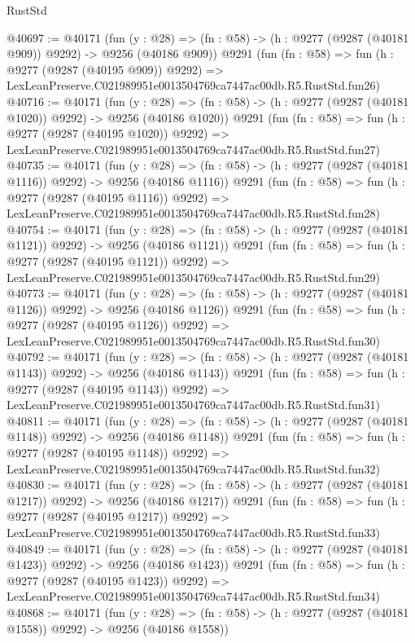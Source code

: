 \begin{lexlean}{RustStd}
\begin{coremodule}
@40697 := @40171
    (fun (y : @28) => (fn : @58) -> (h : @9277 (@9287 (@40181 @909)) @9292) -> @9256 (@40186 @909))
    @9291
    (fun (fn : @58) =>
    fun (h : @9277 (@9287 (@40195 @909)) @9292) =>
    LexLeanPreserve.C021989951e0013504769ca7447ac00db.R5.RustStd.fun26)
@40716 := @40171
    (fun (y : @28) =>
    (fn : @58) -> (h : @9277 (@9287 (@40181 @1020)) @9292) -> @9256 (@40186 @1020))
    @9291
    (fun (fn : @58) =>
    fun (h : @9277 (@9287 (@40195 @1020)) @9292) =>
    LexLeanPreserve.C021989951e0013504769ca7447ac00db.R5.RustStd.fun27)
@40735 := @40171
    (fun (y : @28) =>
    (fn : @58) -> (h : @9277 (@9287 (@40181 @1116)) @9292) -> @9256 (@40186 @1116))
    @9291
    (fun (fn : @58) =>
    fun (h : @9277 (@9287 (@40195 @1116)) @9292) =>
    LexLeanPreserve.C021989951e0013504769ca7447ac00db.R5.RustStd.fun28)
@40754 := @40171
    (fun (y : @28) =>
    (fn : @58) -> (h : @9277 (@9287 (@40181 @1121)) @9292) -> @9256 (@40186 @1121))
    @9291
    (fun (fn : @58) =>
    fun (h : @9277 (@9287 (@40195 @1121)) @9292) =>
    LexLeanPreserve.C021989951e0013504769ca7447ac00db.R5.RustStd.fun29)
@40773 := @40171
    (fun (y : @28) =>
    (fn : @58) -> (h : @9277 (@9287 (@40181 @1126)) @9292) -> @9256 (@40186 @1126))
    @9291
    (fun (fn : @58) =>
    fun (h : @9277 (@9287 (@40195 @1126)) @9292) =>
    LexLeanPreserve.C021989951e0013504769ca7447ac00db.R5.RustStd.fun30)
@40792 := @40171
    (fun (y : @28) =>
    (fn : @58) -> (h : @9277 (@9287 (@40181 @1143)) @9292) -> @9256 (@40186 @1143))
    @9291
    (fun (fn : @58) =>
    fun (h : @9277 (@9287 (@40195 @1143)) @9292) =>
    LexLeanPreserve.C021989951e0013504769ca7447ac00db.R5.RustStd.fun31)
@40811 := @40171
    (fun (y : @28) =>
    (fn : @58) -> (h : @9277 (@9287 (@40181 @1148)) @9292) -> @9256 (@40186 @1148))
    @9291
    (fun (fn : @58) =>
    fun (h : @9277 (@9287 (@40195 @1148)) @9292) =>
    LexLeanPreserve.C021989951e0013504769ca7447ac00db.R5.RustStd.fun32)
@40830 := @40171
    (fun (y : @28) =>
    (fn : @58) -> (h : @9277 (@9287 (@40181 @1217)) @9292) -> @9256 (@40186 @1217))
    @9291
    (fun (fn : @58) =>
    fun (h : @9277 (@9287 (@40195 @1217)) @9292) =>
    LexLeanPreserve.C021989951e0013504769ca7447ac00db.R5.RustStd.fun33)
@40849 := @40171
    (fun (y : @28) =>
    (fn : @58) -> (h : @9277 (@9287 (@40181 @1423)) @9292) -> @9256 (@40186 @1423))
    @9291
    (fun (fn : @58) =>
    fun (h : @9277 (@9287 (@40195 @1423)) @9292) =>
    LexLeanPreserve.C021989951e0013504769ca7447ac00db.R5.RustStd.fun34)
@40868 := @40171
    (fun (y : @28) =>
    (fn : @58) -> (h : @9277 (@9287 (@40181 @1558)) @9292) -> @9256 (@40186 @1558))

\end{coremodule}
\end{lexlean}
